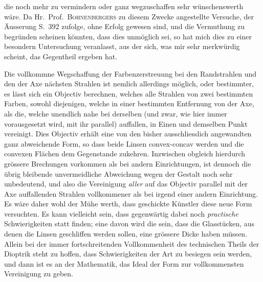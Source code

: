 \par\clearpage
{}
\noindent die noch mehr zu vermindern oder ganz wegzuschaffen sehr wünschenswerth wäre. Da Hr.\ Prof.\ \textsc{Bohnenbergers} zu diesem Zwecke angestellte Versuche, der Äusserung S.\ 392 zufolge, ohne Erfolg gewesen sind, und die Vermuthung zu begründen scheinen könnten, dass dies unmöglich sei, so hat mich dies zu einer besondern Untersuchung veranlasst, aus der sich, was mir sehr merkwürdig scheint, das Gegentheil ergeben hat.

Die vollkommne Wegschaffung der Farbenzerstreuung bei den Randstrahlen und den der Axe nächsten Strahlen ist nemlich allerdings möglich, oder bestimmter, es lässt sich ein Objectiv berechnen, welches alle Strahlen von zwei bestimmten Farben, sowohl diejenigen, welche in einer bestimmten Entfernung von der Axe, als die, welche unendlich nahe bei derselben (und zwar, wie hier immer vorausgesetzt wird, mit ihr parallel) auffallen, in Einen und demselben Punkt vereinigt. Dies Objectiv erhält eine von den bisher ausschliesslich angewandten ganz abweichende Form, so dass beide Linsen convex-concav werden und die convexen Flächen dem Gegenstande zukehren. Inzwischen obgleich hierdurch grössere Brechungen vorkommen als bei andern Einrichtungen, ist dennoch die übrig bleibende unvermeidliche Abweichung wegen der Gestalt noch sehr unbedeutend, und also die Vereinigung \textit{aller} auf das Objectiv parallel mit der Axe auffallenden Strahlen vollkommener als bei irgend einer andern Einrichtung. Es wäre daher wohl der Mühe werth, dass geschickte Künstler diese neue Form versuchten. Es kann vielleicht sein, dass gegenwärtig dabei noch \textit{practische} Schwierigkeiten statt finden; eine davon wird die sein, dass die Glasstücken, aus denen die Linsen geschliffen werden sollen, eine grössere Dicke haben müssen. Allein bei der immer fortschreitenden Vollkommenheit des technischen Theils der Dioptrik steht zu hoffen, dass Schwierigkeiten der Art zu besiegen sein werden, und dann ist es an der Mathematik, das Ideal der Form zur vollkommensten Vereinigung zu geben.

